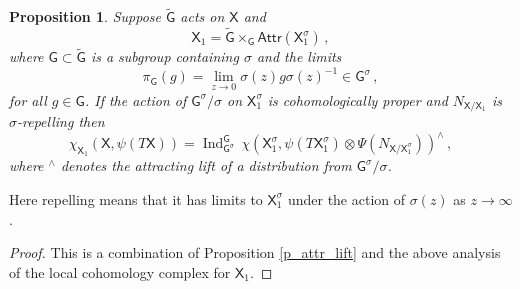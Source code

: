 \documentclass[14pt]{extarticle}
\newcommand{\bG}{\mathsf{G}}
\newcommand{\bX}{\mathsf{X}}
\newcommand{\bS}{\mathsf{S}}
\newcommand{\Sd}{{\bS}^{\raisebox{0.5mm}{$\scriptscriptstyle \bullet$}}}
\newcommand{\Attr}{\mathsf{Attr}}
\DeclareMathOperator{\Ind}{Ind}
\newcommand{\Spm}{\bS^{\pm}}
\newtheorem{Proposition}[Lemma]{Proposition}
\theoremstyle{definition}
\begin{document}
\begin{Proposition}\label{l_lc}
  Suppose $\widetilde{\bG}$ acts on $\bX$ and 
  \[
    \bX_1 = \widetilde{\bG} \times_\bG \Attr(\bX_1^\sigma)\,, 
  \]
  where $\bG \subset \widetilde{\bG}$ is a subgroup
  containing $\sigma$ and the limits
  \[
    \pi_\bG(g) = \lim_{z\to 0} \sigma(z) g \sigma(z)^{-1} \in \bG^\sigma
  \,, 
  \]
  for all $g\in \bG$. If the action of
  $\bG^\sigma/\sigma$ on $\bX_1^\sigma$ is cohomologically proper and $N_{\bX/\bX_1}$ is $\sigma$-repelling
%
%
then
%
\begin{equation}
\chi_{\bX_1}(\bX, \psi(T\bX)) = \Ind^{\bG}_{\bG^\sigma} \, 
\chi(\bX_1^\sigma, \psi(T\bX_1^\sigma) \otimes
\Psi(N_{\bX/\bX_1^\sigma}))^\wedge
\,,\label{eq:5}
\end{equation}
%
where ${}^\wedge$ denotes the attracting lift of a distribution from
$\bG^\sigma/\sigma$. 
\end{Proposition}

\noindent
Here repelling means that it has limits to $\bX_1^\sigma$ under
the action of $\sigma(z)$ as $z \to \infty$. 

\begin{proof}
This is a combination of Proposition \ref{p_attr_lift} and the above
analysis of the local cohomology complex for $\bX_1$. 
\end{proof}



\end{document}
